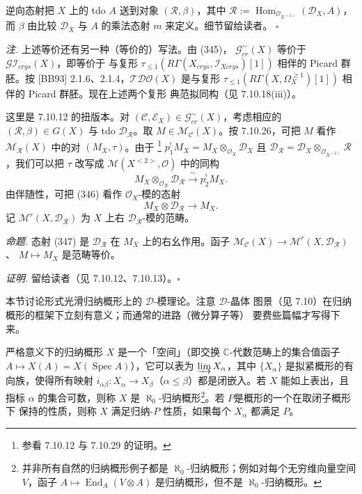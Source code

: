 逆向态射把 $X$ 上的 tdo $A$ 送到对象 $(\mathcal{R},\beta)$，其中
$\mathcal{R}:=\operatorname{Hom}_{\mathcal{O}_{X^{<2>}}}(\mathcal{D}_X,A)$，而
$\beta$ 由比较 $\mathcal{D}_X$ 与 $A$ 的乘法态射 $m$ 来定义。细节留给读者。
\hfill$\square$

 \emph{注.} 上述等价还有另一种（等价的）写法。由 (345)，
$\mathcal{G}^{\sim}_{cr}(X)$ 等价于 $\mathcal{G}\mathcal{I}_{crys}(X)$，即等价于
与复形 $\tau_{\le1}(R\Gamma(X_{crys},\mathcal{I}_{Xcrys})[1])$ 相伴的 Picard
群胚。按 [BB93] 2.1.6、2.1.4，$\mathcal{T}\mathcal{D}\mathcal{O}(X)$ 是与复形
$\tau_{\le1}(R\Gamma(X,\Omega_X^{\ge1})[1])$ 相伴的 Picard 群胚。现在上述两个复形
典范拟同构（见 7.10.18(iii)）。

 这里是 7.10.12 的扭版本。对
$(\mathcal{C},\mathcal{E}_X)\in\mathcal{G}^{\sim}_{cr}(X)$，考虑相应的
$(\mathcal{R},\beta)\in G(X)$ 与 tdo $\mathcal{D}_{\mathcal{R}}$。取
$M\in\mathcal{M}_{\mathcal{C}}(X)$。按 7.10.26，可把 $M$ 看作
$\mathcal{M}_{\mathcal{R}}(X)$ 中的对 $(M_X,\tau)$。由于%
\footnote{参看 7.10.12 与 7.10.29 的证明。}
$p_1^{!}M_X=M_X\otimes_{\mathcal{O}_X}\mathcal{D}_X$ 且
$\mathcal{D}_{\mathcal{R}}=
\mathcal{D}_X\otimes_{\mathcal{O}_{X^{<2>}}}\mathcal{R}$，我们可以把 $\tau$
改写成 $\mathcal{M}(X^{<2>},\mathcal{O})$ 中的同构
\begin{equation}\tag{346}
M_X\otimes_{\mathcal{O}_X}\mathcal{D}_{\mathcal{R}}
\xrightarrow{\ \sim\ }p_2^{!}M_X .
\end{equation}
由伴随性，可把 (346) 看作 $\mathcal{O}_X$-模的态射
\begin{equation}\tag{347}
M_X\otimes\mathcal{D}_{\mathcal{R}}\to M_X .
\end{equation}
记 $\mathcal{M}^{r}(X,\mathcal{D}_{\mathcal{R}})$ 为 $X$ 上右
$\mathcal{D}_{\mathcal{R}}$-模的范畴。

 \emph{命题.} 态射 (347) 是 $\mathcal{D}_{\mathcal{R}}$ 在
$M_X$ 上的右幺作用。函子
$\mathcal{M}_{\mathcal{C}}(X)\to\mathcal{M}^{r}(X,\mathcal{D}_{\mathcal{R}})$、
$M\mapsto M_X$ 是范畴等价。

\emph{证明.} 留给读者（见 7.10.12、7.10.13）。\hfill$\square$


本节讨论形式光滑归纳概形上的 $\mathcal{D}$-模理论。注意 $\mathcal{D}$-晶体
图景（见 7.10）在归纳概形的框架下立刻有意义；而通常的进路（微分算子等）
要费些篇幅才写得下来。

 严格意义下的归纳概形 $X$ 是一个「空间」（即交换
$\mathbb{C}$-代数范畴上的集合值函子
$A\mapsto X(A)=X(\operatorname{Spec}A)$），它可以表为
$\varinjlim X_\alpha$，其中 $\{X_\alpha\}$ 是拟紧概形的有向族，使得所有映射
$i_{\alpha\beta}:X_\alpha\to X_\beta$（$\alpha\le\beta$）都是闭嵌入。若 $X$
能如上表出，且指标 $\alpha$ 的集合可数，则称 $X$ 是
$\aleph_0$-归纳概形\footnote{并非所有自然的归纳概形例子都是
$\aleph_0$-归纳概形；例如对每个无穷维向量空间 $V$，函子
$A\mapsto\operatorname{End}_A(V\otimes A)$ 是归纳概形，但不是
$\aleph_0$-归纳概形。}。若 $P$是概形的一个在取闭子概形下
保持的性质，则称 $X$ 满足归纳-$P$ 性质，如果每个 $X_\alpha$ 都满足 $P$。

